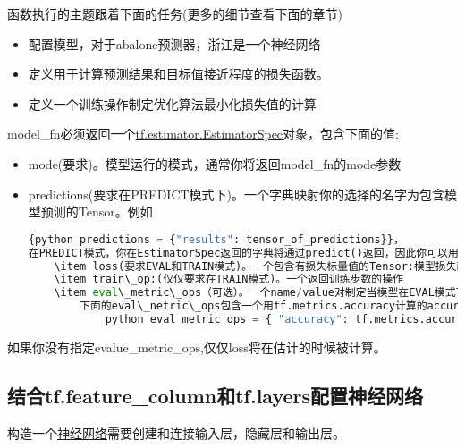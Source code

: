 函数执行的主题跟着下面的任务(更多的细节查看下面的章节)
\begin{itemize}
		\item 配置模型，对于abalone预测器，浙江是一个神经网络
		\item 定义用于计算预测结果和目标值接近程度的损失函数。
		\item 定义一个训练操作制定优化算法最小化损失值的计算
\end{itemize}
model\_fn必须返回一个\href{https://www.tensorflow.org/api_docs/python/tf/estimator/EstimatorSpecC}{tf.estimator.EstimatorSpec}对象，包含下面的值:
\begin{itemize}
	\item mode(要求)。模型运行的模式，通常你将返回model\_fn的mode参数
	\item predictions(要求在PREDICT模式下)。一个字典映射你的选择的名字为包含模型预测的Tensor。例如\begin{lstlisting}[language=Python]{python predictions = {"results": tensor_of_predictions}}，
在PREDICT模式，你在EstimatorSpec返回的字典将通过predict()返回，因此你可以用你想使用的方式构造它
	\item loss(要求EVAL和TRAIN模式)。一个包含有损失标量值的Tensor:模型损失函数(更深的讨论在\href{https://www.tensorflow.org/extend/estimators#defining_loss}{ Defining loss for the model})在输入计算后的的输出。这用于TRAIN模式用于处理错误和采集，自动作为度量包含在EVAL模式。
	\item train\_op:(仅仅要求在TRAIN模式)。一个返回训练步数的操作
	\item eval\_metric\_ops（可选）。一个name/value对制定当模型在EVAL模式下运行时制定将被计算的度量。你的选择的标签的名字用于度量，和你的度量计算的结果。\href{https://www.tensorflow.org/api_docs/python/tf/metrics}{tf.metrics}模块提供预定义的函数用于多种常规测量。
		下面的eval\_netric\_ops包含一个用tf.metrics.accuracy计算的accuracy方法:\begin{lstlisting}[language=Bash]{
			python eval_metric_ops = { "accuracy": tf.metrics.accuracy(labels, predictions) }}
		\end{lstlisting}
\end{itemize}
如果你没有指定evalue\_metric\_ops,仅仅loss将在估计的时候被计算。
\subsection{结合tf.feature\_column和tf.layers配置神经网络}
构造一个\href{https://en.wikipedia.org/wiki/Artificial_neural_network}{神经网络}需要创建和连接输入层，隐藏层和输出层。

